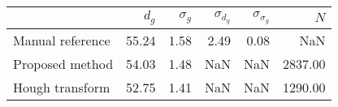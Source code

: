 \begin{tabular}{lrrrrr}
\toprule
{} &  $d_g$ &  $\sigma_g$ &  $\sigma_{d_g}$ &  $\sigma_{\sigma_g}$ &     $N$ \\
\midrule
Manual reference &  55.24 &        1.58 &            2.49 &                 0.08 &     NaN \\
Proposed method  &  54.03 &        1.48 &             NaN &                  NaN & 2837.00 \\
Hough transform  &  52.75 &        1.41 &             NaN &                  NaN & 1290.00 \\
\bottomrule
\end{tabular}

